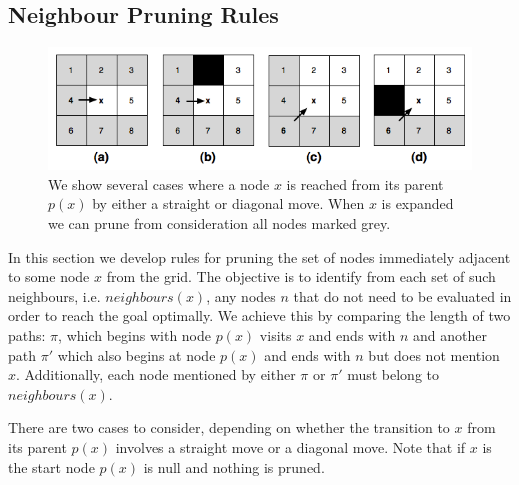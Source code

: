 \subsection{Neighbour Pruning Rules} 
\label{sec:pruning}

\begin{figure}[tb]
       \begin{center}
		   \includegraphics[scale=0.4, trim = 10mm 10mm 10mm 0mm]
			{chapter_jps/diagrams/pruningrules.png}
       \end{center}
	\vspace{-3pt}
       \caption{We show several cases where a node $x$ is reached from its
parent $p(x)$ by either a straight or diagonal move. When $x$ is expanded we can
prune from consideration all nodes marked grey.}
       \label{fig::jps::pruning}
\end{figure}

In this section we develop rules for pruning the set of nodes immediately 
adjacent to some node $x$ from the grid.
The objective is to identify from each
set of such neighbours, i.e. $neighbours(x)$, any nodes $n$ that do not need to be evaluated in order to
reach the goal optimally. We achieve this by comparing the length of two paths:
$\pi$, which begins with node $p(x)$ visits $x$ and ends with $n$ and another
path $\pi'$ which also begins at node $p(x)$ and ends with $n$ but does not 
mention $x$. 
Additionally, each node mentioned by either $\pi$ or $\pi'$ must belong to 
$neighbours(x)$. 

There are two cases to consider, depending on
whether the transition to $x$ from its parent $p(x)$ involves a straight move or
a diagonal move. Note that if $x$ is the start node $p(x)$ is null and nothing
is pruned.

